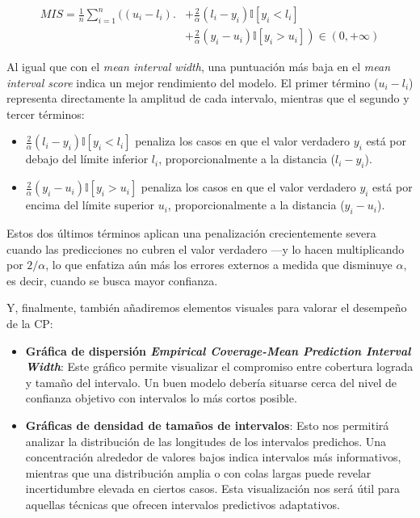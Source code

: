 \begin{itemize}
    \begin{align*} 
    MIS = \frac{1}{n} \sum_{i=1}^n
    \biggl( (u_i-l_i) \biggr.&+ \frac{2}{\alpha} \left( l_i-y_i \right) \mathbb{I}\left[ y_i<l_i \right] \\
    &+\left. \frac{2}{\alpha}  \left( y_i-u_i \right) \mathbb{I}\left[ y_i>u_i \right] \right)
    \in \left( 0, +\infty \right)
    \end{align*}

    Al igual que con el \textit{mean interval width}, una puntuación más baja en el \textit{mean interval score} indica un mejor rendimiento del modelo. El primer término ($u_i-l_i$) representa directamente la amplitud de cada intervalo, mientras que el segundo y tercer términos:

    \begin{itemize}
        \item $\frac{2}{\alpha} \left( l_i-y_i \right) \mathbb{I}\left[ y_i<l_i \right]$ penaliza los casos en que el valor verdadero $y_i$ está por debajo del límite inferior $l_i$, proporcionalmente a la distancia ($l_i-y_i$).
        \item $\frac{2}{\alpha}  \left( y_i-u_i \right) \mathbb{I}\left[ y_i>u_i \right]$ penaliza los casos en que el valor verdadero $y_i$ está por encima del límite superior $u_i$, proporcionalmente a la distancia ($y_i-u_i$).
    \end{itemize}

    Estos dos últimos términos aplican una penalización crecientemente severa cuando las predicciones no cubren el valor verdadero ---y lo hacen multiplicando por $2/\alpha$, lo que enfatiza aún más los errores externos a medida que disminuye $\alpha$, es decir, cuando se busca mayor confianza.

\end{itemize}

Y, finalmente, también añadiremos elementos visuales para valorar el desempeño de la CP:

\begin{itemize}

    \item \textbf{Gráfica de dispersión \textit{Empirical Coverage-Mean Prediction Interval Width}}: Este gráfico permite visualizar el compromiso entre cobertura lograda y tamaño del intervalo. Un buen modelo debería situarse cerca del nivel de confianza objetivo con intervalos lo más cortos posible.
    
    \item \textbf{Gráficas de densidad de tamaños de intervalos}: Esto nos permitirá analizar la distribución de las longitudes de los intervalos predichos. Una concentración alrededor de valores bajos indica intervalos más informativos, mientras que una distribución amplia o con colas largas puede revelar incertidumbre elevada en ciertos casos. Esta visualización nos será útil para aquellas técnicas que ofrecen intervalos predictivos adaptativos. 

\end{itemize}

